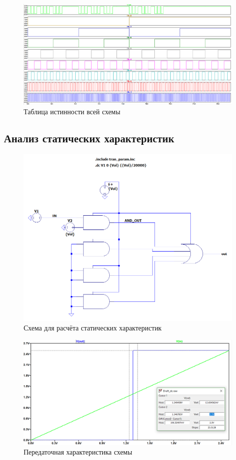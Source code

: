 \documentclass[a4paper,14pt]{article}
\begin{document}
\begin{figure}[H]
	\centering		
	\includegraphics[width=\linewidth]{image/spice_bin}
	\caption{Таблица истинности всей схемы}\label{img:spice_bin}
\end{figure}

\subsection{Анализ статических характеристик}

\begin{figure}[H]
	\centering		
	\includegraphics[width=\linewidth]{image/dc_schema}
	\caption{Схема для расчёта статических характеристик}\label{img:dc_schema}
\end{figure}

\begin{figure}[H]
	\centering		
	\includegraphics[width=\linewidth]{image/dc_V_01}
	\caption{Передаточная характеристика схемы}\label{img:dc_V_01}
\end{figure}
\end{document}
